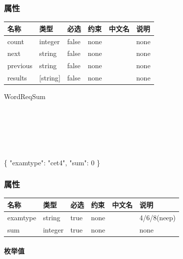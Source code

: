 \documentclass[
]{article}
\newenvironment{Shaded}{}{}
\newcommand{\DataTypeTok}[1]{\textcolor[rgb]{0.56,0.13,0.00}{#1}}
\newcommand{\DecValTok}[1]{\textcolor[rgb]{0.25,0.63,0.44}{#1}}
\newcommand{\FunctionTok}[1]{\textcolor[rgb]{0.02,0.16,0.49}{#1}}
\newcommand{\StringTok}[1]{\textcolor[rgb]{0.25,0.44,0.63}{#1}}
\begin{document}
\hypertarget{ux5c5eux6027-7}{%
\subsubsection{属性}\label{ux5c5eux6027-7}}

\begin{longtable}[]{@{}llllll@{}}
\toprule
名称 & 类型 & 必选 & 约束 & 中文名 & 说明 \\
\midrule
\endhead
count & integer & false & none & & none \\
next & string & false & none & & none \\
previous & string & false & none & & none \\
results & {[}string{]} & false & none & & none \\
\bottomrule
\end{longtable}

WordReqSum

\strut \\
\strut \\
\strut \\

\begin{Shaded}
\begin{Highlighting}[]
\FunctionTok{\{}
  \DataTypeTok{"examtype"}\FunctionTok{:} \StringTok{"cet4"}\FunctionTok{,}
  \DataTypeTok{"sum"}\FunctionTok{:} \DecValTok{0}
\FunctionTok{\}}
\end{Highlighting}
\end{Shaded}

\hypertarget{ux5c5eux6027-8}{%
\subsubsection{属性}\label{ux5c5eux6027-8}}

\begin{longtable}[]{@{}llllll@{}}
\toprule
名称 & 类型 & 必选 & 约束 & 中文名 & 说明 \\
\midrule
\endhead
examtype & string & true & none & & 4/6/8(neep) \\
sum & integer & true & none & & none \\
\bottomrule
\end{longtable}

\hypertarget{ux679aux4e3eux503c-10}{%
\paragraph{枚举值}\label{ux679aux4e3eux503c-10}}
\end{document}
